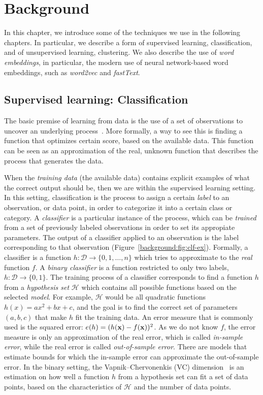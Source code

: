 \chapter{Background}

In this chapter, we introduce some of the techniques we use in the following
chapters. 
%
In particular, we describe a form of supervised learning, classification, and of
unsupervised learning, clustering.
%
We also describe the use of {\em word embeddings}, in particular, the modern use
of neural network-based word embeddings, such as {\em word2vec} and {\em
fastText}.


\section{Supervised learning: Classification}

The basic premise of learning from data is the use of a set of observations to
uncover an underlying process~\cite{Abu-Mostafa:2012:LD:2207825}. 
%
More formally, a way to see this is finding a function that optimizes certain
score, based on the available data. 
%
This function can be seen as an approximation of the real, unknown function
that describes the process that generates the data.


When the {\em training data} (the available data) contains explicit examples of
what the correct output should be, then we are within the supervised learning
setting.
%
In this setting, classification is the process to assign a certain {\em label}
to an observation, or data point, in order to categorize it into a certain class
or category.
%
A {\em classifier} is a particular instance of the process, which can be {\em
trained} from a set of previously labeled observations in order to set its
appropiate parameters.
%
The output of a classifier applied to an observation is the label corresponding
to that observation (Figure~\ref{background:fig:clf-ex}).
%
Formally, a classifier is a function $h: \mathcal{D} \rightarrow \{0, 1, \ldots,
n\}$ which tries to approximate to the {\em real} function $f$.
%
A {\em binary classifier} is a function restricted to only two labels, $h:
\mathcal{D} \rightarrow \{0, 1\}$.
%
The training process of a classifier corresponds to find a function $h$ from a
{\em hypothesis set} $\mathcal{H}$ which contains all possible functions based
on the selected {\em model}.
%
For example, $\mathcal{H}$ would be all quadratic functions $h(x) = ax^2 + bx +
c$, and the goal is to find the correct set of parameters $(a, b, c)$ that make
$h$ fit the training data.
%
An error measure that is commonly used is the squared error: $e(h) =
(h(\boldsymbol{\mathbf{x}}) - f(\boldsymbol{\mathbf{x}}))^2$.
%
As we do not know $f$, the error measure is only an approximation of the real
error, which is called {\em in-sample error}, while the real error is called
{\em out-of-sample error}.
% 
There are models that estimate bounds for which the in-sample error can
approximate the out-of-sample error.
%
In the binary setting, the Vapnik–Chervonenkis (VC) dimension~\cite{Vapnik2015}
is an estimation on how well a function $h$ from a hypothesis set can fit a set
of data points, based on the characteristics of $\mathcal{H}$ and the number of
data points.

